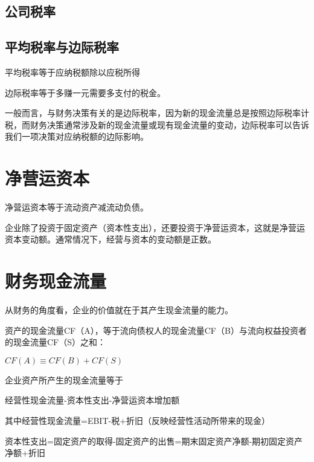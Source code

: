 \documentclass{article}
\begin{document}
\subsection{公司税率}

\subsection{平均税率与边际税率}
平均税率等于应纳税额除以应税所得

\hspace*{\fill}

边际税率等于多赚一元需要多支付的税金。

\hspace*{\fill}

一般而言，与财务决策有关的是边际税率，因为新的现金流量总是按照边际税率计税，而财务决策通常涉及新的现金流量或现有现金流量的变动，边际税率可以告诉我们一项决策对应纳税额的边际影响。

\section{净营运资本}
净营运资本等于流动资产减流动负债。

\hspace*{\fill}

企业除了投资于固定资产（资本性支出），还要投资于净营运资本，这就是净营运资本变动额。通常情况下，经营与资本的变动额是正数。

\section{财务现金流量}
从财务的角度看，企业的价值就在于其产生现金流量的能力。

\hspace*{\fill}

资产的现金流量CF（A），等于流向债权人的现金流量CF（B）与流向权益投资者的现金流量CF（S）之和：

$ CF(A)\equiv CF(B)+CF(S) $

\hspace*{\fill}

企业资产所产生的现金流量等于

经营性现金流量-资本性支出-净营运资本增加额

\hspace*{\fill}

其中经营性现金流量=EBIT-税+折旧（反映经营性活动所带来的现金）

资本性支出=固定资产的取得-固定资产的出售=期末固定资产净额-期初固定资产净额+折旧
\end{document}
